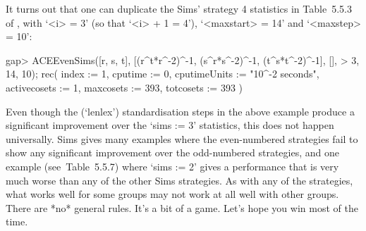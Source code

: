 It turns out that one can duplicate the Sims' strategy 4 statistics in
Table~5.5.3 of \cite{Sim94}, with `<i> = 3' (so that `<i> + 1  =  4'),
`<maxstart> = 14' and `<maxstep> = 10':

\beginexample
gap> ACEEvenSims([r, s, t], [(r^t*r^-2)^-1, (s^r*s^-2)^-1, (t^s*t^-2)^-1], [],
>                3, 14, 10);
rec( index := 1, cputime := 0, cputimeUnits := "10^-2 seconds", 
  activecosets := 1, maxcosets := 393, totcosets := 393 )
\endexample

Even though the (`lenlex') standardisation steps in the above  example
produce a significant improvement over the  `sims  :=  3'  statistics,
this  does  not  happen  universally.  Sims  \cite{Sim94}  gives  many
examples  where  the  even-numbered  strategies  fail  to   show   any
significant improvement over  the  odd-numbered  strategies,  and  one
example (see~Table~5.5.7) where `sims := 2' gives a  performance  that
is very much worse than any of the other Sims strategies. As with  any
of the strategies, what works well for some groups may not work at all
well with other groups. There are *no* general rules. It's a bit of  a
game. Let's hope you win most of the time.

